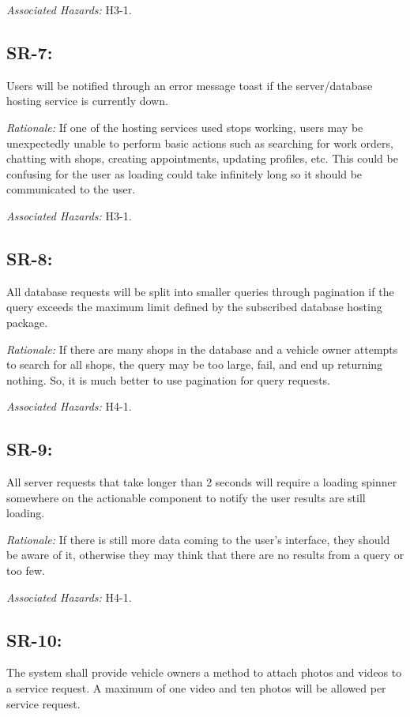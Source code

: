 \documentclass{article}
\begin{document}
\emph{Associated Hazards: }H3-1.

\subsection*{SR-7:}
Users will be notified through an error message toast if the server/database hosting service is currently down.

\emph{Rationale: }If one of the hosting services used stops working, users may be unexpectedly unable to perform basic actions such as searching for work orders, chatting with shops, creating appointments, updating profiles, etc. This could be confusing for the user as loading could take infinitely long so it should be communicated to the user.

\emph{Associated Hazards: }H3-1.

\subsection*{SR-8:}
All database requests will be split into smaller queries through pagination if the query exceeds the maximum limit defined by the subscribed database hosting package.

\emph{Rationale: }If there are many shops in the database and a vehicle owner attempts to search for all shops, the query may be too large, fail, and end up returning nothing. So, it is much better to use pagination for query requests.

\emph{Associated Hazards: }H4-1.

\subsection*{SR-9:}
All server requests that take longer than 2 seconds will require a loading spinner somewhere on the actionable component to notify the user results are still loading.

\emph{Rationale: }If there is still more data coming to the user's interface, they should be aware of it, otherwise they may think that there are no results from a query or too few.

\emph{Associated Hazards: }H4-1.

\subsection*{SR-10:}
The system shall provide vehicle owners a method to attach photos and videos to a service request. A maximum of one video and ten photos will be allowed per service request.
\end{document}
